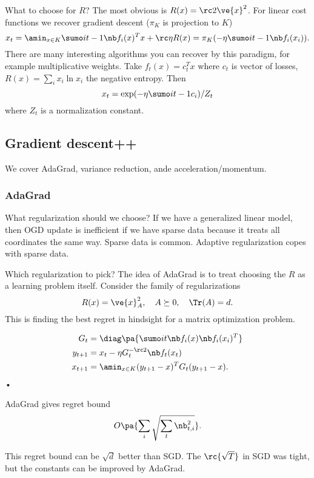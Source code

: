 What to choose for $R$? The most obvious is $R(x) = \rc 2\ve{x}^2$. For linear cost functions we recover gradient descent ($\pi_K$ is projection to $K$)
$$
x_t=\amin_{x\in K} \sumo i{t-1} \nb f_i(x)^T x + \rc \eta R(x) = \pi_K (-\eta\sumo i{t-1}\nb f_i(x_i)).
$$
There are many interesting algorithms you can recover by this paradigm, for example multiplicative weights. Take
$f_t(x)=c_t^Tx$ where $c_t$ is vector of losses, $R(x) = \sum_i x_i\ln x_i$ the negative entropy. Then
$$
x_t=\exp(-\eta \sumo i{t-1}c_i)/Z_t
$$
where $Z_t$ is a normalization constant.



\subsection{Gradient descent++}

We cover AdaGrad, variance reduction, ande acceleration/momentum.
\subsubsection{AdaGrad}

What regularization should we choose? 
If we have a generalized linear model, then OGD update is inefficient if we have sparse data because it treats all coordinates the same way. Sparse data is common. 
Adaptive regularization copes with sparse data.

Which regularization to pick? The idea of AdaGrad is to treat choosing the $R$ as a learning problem itself. Consider the family of regularizations
$$
R(x) = \ve{x}_A^2, \quad A\succeq 0, \quad \Tr(A)=d.
$$
This is finding the best regret in hindsight for a matrix optimization problem.

\begin{alg}[AdaGrad]
\begin{align}
G_t&=\diag\pa{\sumo it \nb f_i(x)\nb f_i(x_i)^T}\\
y_{t+1} &= x_t - \eta G_t^{-\rc 2} \nb f_t(x_t)\\
x_{t+1} &= \amin_{x\in K} (y_{t+1}-x)^T G_t(y_{t+1}-x).
\end{align}•
\end{alg}
\begin{thm}
AdaGrad gives regret bound
$$
O\pa{\sum_i \sqrt{\sum_t \nb_{t,i}^2}}.
$$
\end{thm}
This regret bound can be $\sqrt d$ better than SGD.
The $\rc{\sqrt T}$ in SGD was tight, but the constants can be improved by AdaGrad.


